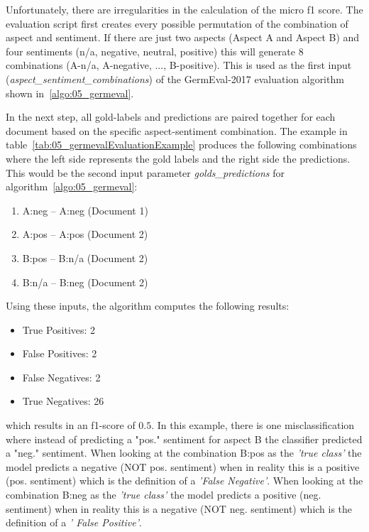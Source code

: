 Unfortunately, there are irregularities in the calculation of the micro f1 score. The evaluation script first creates every possible permutation of the combination of aspect and sentiment. If there are just two aspects {(Aspect A and Aspect B)} and four sentiments {(n/a, negative, neutral, positive)} this will generate 8 combinations {(A-n/a, A-negative, ..., B-positive)}. This is used as the first input {(\textit{aspect\_sentiment\_combinations})} of the GermEval-2017 evaluation algorithm shown in~\ref{algo:05_germeval}.
\medskip

In the next step, all gold-labels and predictions are paired together for each document based on the specific aspect-sentiment combination. The example in table~\ref{tab:05_germevalEvaluationExample} produces the following combinations where the left side represents the gold labels and the right side the predictions. This would be the second input parameter \textit{golds\_predictions} for algorithm~\ref{algo:05_germeval}: 

\begin{enumerate}
    \item A:neg -- A:neg (Document 1)
    \item A:pos -- A:pos (Document 2)
    \item B:pos -- B:n/a (Document 2)
    \item B:n/a -- B:neg (Document 2)
\end{enumerate}

Using these inputs, the algorithm computes the following results:

\begin{itemize}
    \item True Positives: 2
    \item False Positives: 2
    \item False Negatives: 2
    \item True Negatives: 26
\end{itemize}

which results in an f1-score of $0.5$. In this example, there is one misclassification where instead of predicting a "pos." sentiment for aspect B the classifier predicted a "neg." sentiment. When looking at the combination B:pos as the \textit{'true class'} the model predicts a negative {(NOT pos. sentiment)} when in reality this is a positive {(pos. sentiment)} which is the definition of a \textit{'False Negative'}. When looking at the combination B:neg as the \textit{'true class'} the model predicts a positive {(neg. sentiment)} when in reality this is a negative {(NOT neg. sentiment)} which is the definition of a \textit{' False Positive'}.
\medskip

